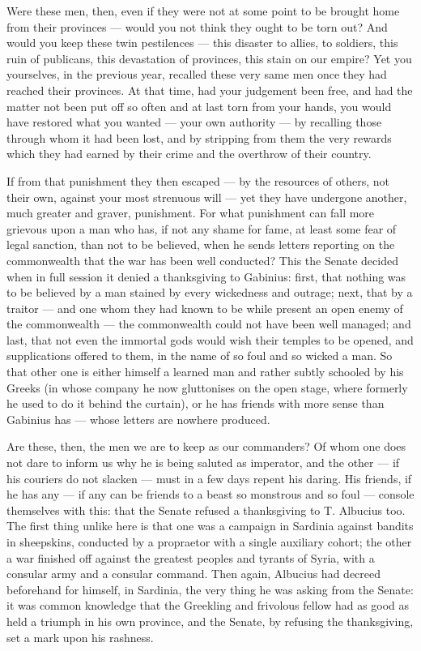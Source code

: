  Were these men, then, even if they were not at some point to be brought home from their provinces --- would you not think they ought to be torn out? And would you keep these twin pestilences --- this disaster to allies, to soldiers, this ruin of publicans, this devastation of provinces, this stain on our empire? Yet you yourselves, in the previous year, recalled these very same men once they had reached their provinces. At that time, had your judgement been free, and had the matter not been put off so often and at last torn from your hands, you would have restored what you wanted --- your own authority --- by recalling those through whom it had been lost, and by stripping from them the very rewards which they had earned by their crime and the overthrow of their country.

 If from that punishment they then escaped --- by the resources of others, not their own, against your most strenuous will --- yet they have undergone another, much greater and graver, punishment. For what punishment can fall more grievous upon a man who has, if not any shame for fame, at least some fear of legal sanction, than not to be believed, when he sends letters reporting on the commonwealth that the war has been well conducted? This the Senate decided when in full session it denied a thanksgiving to Gabinius: first, that nothing was to be believed by a man stained by every wickedness and outrage; next, that by a traitor --- and one whom they had known to be while present an open enemy of the commonwealth --- the commonwealth could not have been well managed; and last, that not even the immortal gods would wish their temples to be opened, and supplications offered to them, in the name of so foul and so wicked a man. So that other one is either himself a learned man and rather subtly schooled by his Greeks (in whose company he now gluttonises on the open stage, where formerly he used to do it behind the curtain), or he has friends with more sense than Gabinius has --- whose letters are nowhere produced.

 Are these, then, the men we are to keep as our commanders? Of whom one does not dare to inform us why he is being saluted as imperator, and the other --- if his couriers do not slacken --- must in a few days repent his daring. His friends, if he has any --- if any can be friends to a beast so monstrous and so foul --- console themselves with this: that the Senate refused a thanksgiving to T. Albucius too. The first thing unlike here is that one was a campaign in Sardinia against bandits in sheepskins, conducted by a propraetor with a single auxiliary cohort; the other a war finished off against the greatest peoples and tyrants of Syria, with a consular army and a consular command. Then again, Albucius had decreed beforehand for himself, in Sardinia, the very thing he was asking from the Senate: it was common knowledge that the Greekling and frivolous fellow had as good as held a triumph in his own province, and the Senate, by refusing the thanksgiving, set a mark upon his rashness.

